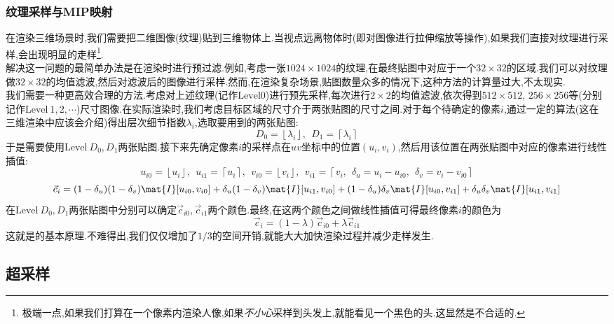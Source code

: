 \documentclass{ctexart}
\begin{document}
\subsubsection{纹理采样与MIP映射}
在渲染三维场景时,我们需要把二维图像(纹理)贴到三维物体上.当视点远离物体时(即对图像进行拉伸缩放等操作),如果我们直接对纹理进行采样,会出现明显的走样\footnote{极端一点,如果我们打算在一个像素内渲染人像,如果\textit{不小心}采样到头发上,就能看见一个黑色的头.这显然是不合适的.}.\\
\indent 解决这一问题的最简单办法是在渲染时进行预过滤.例如,考虑一张$1024\times1024$的纹理,在最终贴图中对应于一个$32\times32$的区域.我们可以对纹理做$32\times32$的均值滤波,然后对滤波后的图像进行采样.然而,在渲染复杂场景,贴图数量众多的情况下,这种方法的计算量过大,不太现实.\\
\indent 我们需要一种更高效合理的方法.考虑对上述纹理(记作$\text{Level} 0$)进行预先采样,每次进行$2\times2$的均值滤波,依次得到$512\times512$, $256\times256$等(分别记作$\text{Level}\ 1,2,\cdots$)尺寸图像.在实际渲染时,我们考虑目标区域的尺寸介于两张贴图的尺寸之间.对于每个待确定的像素$i$,通过一定的算法(这在三维渲染中应该会介绍)得出层次细节指数$\lambda_i$,选取要用到的两张贴图:
\[D_0=\left\lfloor \lambda_i\right\rfloor,\ \ D_1=\left\lceil \lambda_i\right\rceil\]
于是需要使用$\text{Level}\ D_0,D_1$两张贴图.接下来先确定像素$i$的采样点在$uv$坐标中的位置$\left(u_i,v_i\right)$,然后用该位置在两张贴图中对应的像素进行线性插值:
\[u_{i0}=\left\lfloor u_i\right\rfloor,\ \ u_{i1}=\left\lceil u_i\right\rceil,\ \ v_{i0}=\left\lfloor v_i\right\rfloor,\ \ v_{i1}=\left\lceil v_i,\ \ \delta_u=u_i-u_{i0},\ \ \delta_v=v_i-v_{i0}\right\rceil\]
\[\vec{c}_{i}=(1-\delta_u)(1-\delta_v)\mat{I}[u_{i0},v_{i0}]+\delta_u(1-\delta_v)\mat{I}[u_{i1},v_{i0}]+(1-\delta_u)\delta_v\mat{I}[u_{i0},v_{i1}]+\delta_u\delta_v\mat{I}[u_{i1},v_{i1}]\]
在$\text{Level}\ D_0,D_1$两张贴图中分别可以确定$\vec{c}_{i0},\vec{c}_{i1}$两个颜色.最终,在这两个颜色之间做线性插值可得最终像素$i$的颜色为
\[\vec{c}_i=(1-\lambda)\vec{c}_{i0}+\lambda\vec{c}_{i1}\]
这就是的基本原理.不难得出,我们仅仅增加了$1/3$的空间开销,就能大大加快渲染过程并减少走样发生.
\subsection{超采样}
\end{document}
